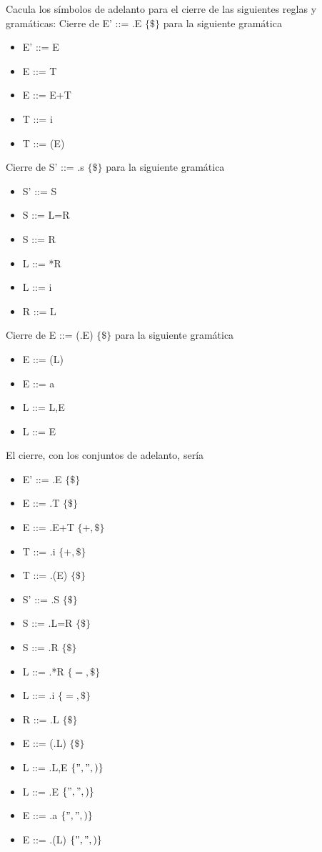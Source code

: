 \begin{problem}
Cacula los símbolos de adelanto para el cierre de las siguientes reglas y gramáticas:
\ppart Cierre de E' ::= .E $\{ \$ \}$ para la siguiente gramática
\begin{itemize}
\item E' ::= E
\item E ::= T
\item E ::= E+T
\item T ::= i
\item T ::= (E)
\end{itemize}

\ppart Cierre de S' ::= .s $\{ \$ \}$ para la siguiente gramática
\begin{itemize}
\item S' ::= S
\item S ::= L=R
\item S ::= R
\item L ::= *R
\item L ::= i
\item R ::= L
\end{itemize}

\ppart Cierre de E ::= (.E) $\{ \$ \}$ para la siguiente gramática
\begin{itemize}
\item E ::= (L)
\item E ::= a
\item L ::= L,E
\item L ::= E
\end{itemize}
\solution
\ppart
El cierre, con los conjuntos de adelanto, sería
\begin{itemize}
\item E' ::= .E $\{\$\}$
\item E ::= .T $\{\$\}$
\item E ::= .E+T $\{+,\$\}$
\item T ::= .i $\{+,\$\}$
\item T ::= .(E) $\{\$\}$
\end{itemize}

\ppart
\begin{itemize}
\item S' ::= .S $\{\$\}$
\item S ::= .L=R $\{\$\}$
\item S ::= .R $\{\$\}$
\item L ::= .*R $\{=, \$\}$
\item L ::= .i $\{=, \$\}$
\item R ::= .L $\{\$\}$
\end{itemize}

\ppart
\begin{itemize}
\item E ::= (.L) $\{\$\}$
\item L ::= .L,E $\{",", )\}$
\item L ::= .E $\{",", )\}$
\item E ::= .a $\{",", )\}$
\item E ::= .(L) $\{",", )\}$
\end{itemize}
\end{problem}

